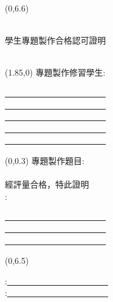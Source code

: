 \documentclass[UTF8]{ctexart}
\newcommand{\eigh}{\fontsize{18pt}{\baselineskip}\selectfont}%
\newcommand{\fourteen}{\fontsize{14pt}{\baselineskip}\selectfont}%
\begin{document}
    {\begin{textblock}{12}(0,6.6)
    {\begin{center}
    \noindent \kaishu \eigh {}
    \end{center}}
    \end{textblock}}
    \newpage
    {\begin{center}
    {\renewcommand\baselinestretch{1.4}
    \kaishu \eigh {國立虎尾科技大學 \qquad 機械設計工程系}\\{學生專題製作合格認可證明}\\
    \hspace*{\fill} \\ %
    \par}
     \end{center}}
    {\begin{textblock}{60}(1.85,0)
    \noindent \kaishu \fourteen 專題製作修習學生\enspace:\quad
    {\begin{minipage}[t]{10em}\underline{　　　　　　　　　　　　}\\ \underline{　　　　　　　　　　　　}\\ \underline{　　　　　　　　　　　　}\\ \underline{　　　　　　　　　　　　}\\ \underline{　　　　　　　　　　　　}\\ %
    \end{minipage}}
    {\begin{textblock}{30}(0,0.3)
    \noindent \kaishu \fourteen 專題製作題目\enspace:\quad
    \hspace*{\fill} \\
    \hspace*{\fill} \\
    \noindent \kaishu \fourteen 經評量合格，特此證明
    \hspace*{\fill} \\
    \noindent \kaishu \fourteen {}\enspace:\quad
    {\begin{minipage}[t]{6em} \underline{　　　　　　　　　　　　}\\ \underline{　　　　　　　　　　　　}\\ \underline{　　　　　　　　　　　　}\\
    \end{minipage}}
    \end{textblock}}
    {\begin{textblock}{10}(0,6.5)
    {\begin{flushleft}
    \kaishu \fourteen {}\enspace:\quad \underline{　　　　　　　　　　　　}\\
    \kaishu \fourteen {}\enspace:\quad \underline{　　　　　　　　　　　　}\\
    \hspace*{\fill} \\
    \kaishu \fourteen {}\qquad{}\qquad{}\qquad{}
    \end{flushleft}}
    \end{textblock}}
    \end{textblock}}
\end{document}
